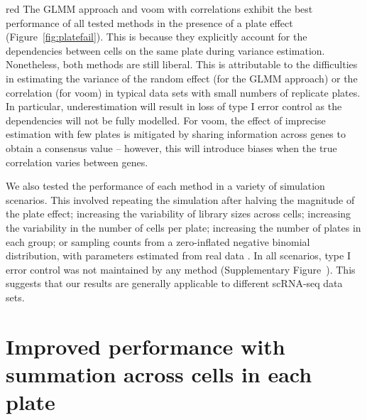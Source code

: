\documentclass[oupdraft]{bio}
\begin{document}
\begin{color}{red}
The GLMM approach and voom with correlations exhibit the best performance of all tested methods in the presence of a plate effect (Figure~\ref{fig:platefail}).
This is because they explicitly account for the dependencies between cells on the same plate during variance estimation.
Nonetheless, both methods are still liberal.
This is attributable to the difficulties in estimating the variance of the random effect (for the GLMM approach) or the correlation (for voom) in typical data sets with small numbers of replicate plates.
In particular, underestimation will result in loss of type I error control as the dependencies will not be fully modelled.
For voom, the effect of imprecise estimation with few plates is mitigated by sharing information across genes to obtain a consensus value -- however, this will introduce biases when the true correlation varies between genes.


We also tested the performance of each method in a variety of simulation scenarios.
This involved repeating the simulation after halving the magnitude of the plate effect; increasing the variability of library sizes across cells; increasing the variability in the number of cells per plate; increasing the number of plates in each group; or sampling counts from a zero-inflated negative binomial distribution, with parameters estimated from real data \citep{zeilis2008regression}.
In all scenarios, type I error control was not maintained by any method (Supplementary Figure~\suppfailsim{}).
This suggests that our results are generally applicable to different scRNA-seq data sets.
\end{color}

\section{Improved performance with summation across cells in each plate}
\end{document}
